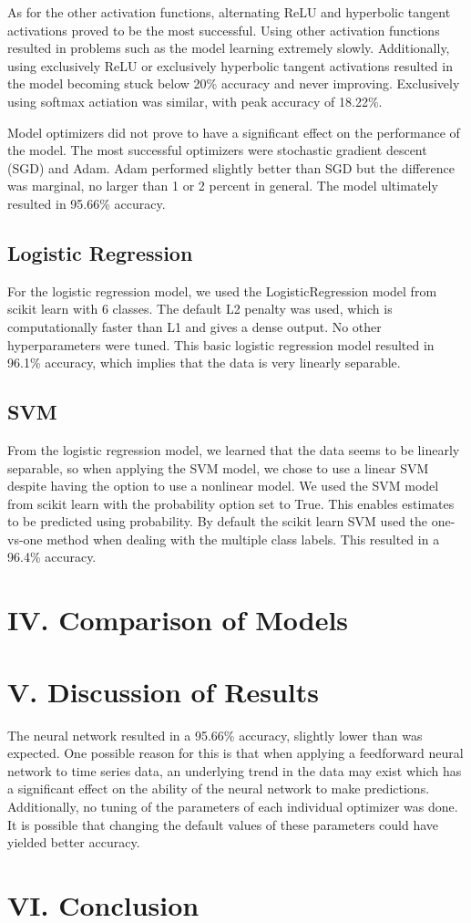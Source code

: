 \documentclass[12pt]{article}
\begin{document}
As for the other activation functions, alternating ReLU and hyperbolic tangent activations proved to be the most successful. Using other activation functions resulted in problems such as the model learning extremely slowly. Additionally, using exclusively ReLU or exclusively hyperbolic tangent activations resulted in the model becoming stuck below 20\% accuracy and never improving. Exclusively using softmax actiation was similar, with peak accuracy of 18.22\%.

Model optimizers did not prove to have a significant effect on the performance of the model. The most successful optimizers were stochastic gradient descent (SGD) and Adam. Adam performed slightly better than SGD but the difference was marginal, no larger than 1 or 2 percent in general. The model ultimately resulted in 95.66\% accuracy. 

\subsection*{Logistic Regression}
For the logistic regression model, we used the LogisticRegression model from scikit learn with 6 classes. The default L2 penalty was used, which is computationally faster than L1 and gives a dense output. No other hyperparameters were tuned. This basic logistic regression model resulted in 96.1\% accuracy, which implies that the data is very linearly separable.

\subsection*{SVM}
From the logistic regression model, we learned that the data seems to be linearly separable, so when applying the SVM model, we chose to use a linear SVM despite having the option to use a nonlinear model. We used the SVM model from scikit learn with the probability option set to True. This enables estimates to be predicted using probability. By default the scikit learn SVM used the one-vs-one method when dealing with the multiple class labels. This resulted in a 96.4\% accuracy.
\section*{IV. Comparison of Models}
\section*{V. Discussion of Results}
The neural network resulted in a 95.66\% accuracy, slightly lower than was expected. One possible reason for this is that when applying a feedforward neural network to time series data, an underlying trend in the data may exist which has a significant effect on the ability of the neural network to make predictions. Additionally, no tuning of the parameters of each individual optimizer was done. It is possible that changing the default values of these parameters could have yielded better accuracy. 

\section*{VI. Conclusion}
\end{document}
